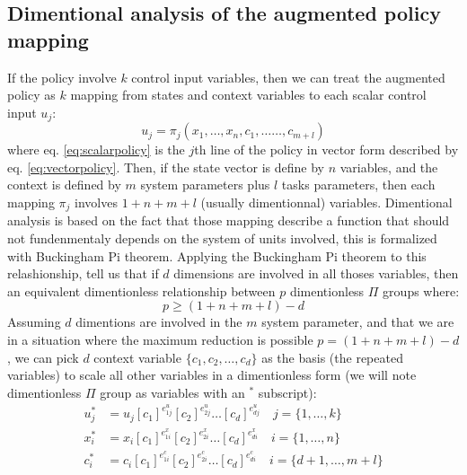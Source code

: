 \subsection{Dimentional analysis of the augmented policy mapping}

If the policy involve $k$ control input variables, then we can treat the augmented policy as $k$ mapping from states and context variables to each scalar control input $u_j$:
\begin{equation}
u_j = \pi_j \left(
x_1, \hdots, x_n, 
c_1, \hdots \hdots, c_{m+l}
\right) 
\label{eq:scalarpolicy}
\end{equation}
where eq. \eqref{eq:scalarpolicy} is the $j$th line of the policy in vector form described by eq. \eqref{eq:vectorpolicy}.
Then, if the state vector is define by $n$ variables, and the context is defined by $m$ system parameters plus $l$ tasks parameters, then each mapping $\pi_j$ involves $1 + n + m + l$ (usually dimentionnal) variables. Dimentional analysis is based on the fact that those mapping describe a function that should not fundenmentaly depends on the system of units involved, this is formalized with Buckingham Pi theorem. Applying the Buckingham Pi theorem to this relashionship, tell us that if $d$ dimensions are involved in all thoses variables, then an equivalent dimentionless relationship between $p$ dimentionless $\Pi$ groups where:
\begin{equation}
p \geq (1 + n + m + l ) - d
\end{equation}
Assuming $d$ dimentions are involved in the $m$ system parameter, and that we are in a situation where the maximum reduction is possible $p = (1 + n + m + l ) - d$, we can pick $d$ context variable $\{c_1, c_2 , \hdots,c_d\}$ as the basis (the repeated variables) to scale all other variables in a dimentionless form (we will note dimentionless $\Pi$ group as variables with an ${}^*$ subscript):
\begin{align}
u_j^* &= u_j \left[ c_1 \right]^{e^u_{1j}} \left[ c_2 \right]^{e^u_{2j}} \hdots \left[ c_d \right]^{e^u_{dj}} \quad \scriptstyle j = \{ 1, \hdots , k \} \label{eq:piu}\\
x_i^* &= x_i \left[ c_1 \right]^{e^x_{1i}} \left[ c_2 \right]^{e^x_{2i}} \hdots \left[ c_d \right]^{e^x_{di}} \quad \scriptstyle i = \{ 1, \hdots , n \} \label{eq:pix}\\
c_i^* &= c_i\left[ c_1 \right]^{e^c_{1i}} \left[ c_2 \right]^{e^c_{2i}} \hdots \left[ c_d \right]^{e^c_{di}} \quad \scriptstyle i = \{ d+1, \hdots , m+l \} \label{eq:pic}%
\end{align}
